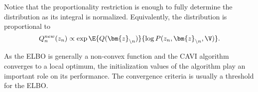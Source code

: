 Notice that the proportionality restriction is enough to fully determine the distribution as its integral is normalized. Equivalently, the distribution is proportional to
\[
    Q_{n}^{new}(z_{n}) \propto \exp{\E{Q(\bm{z}_{\backslash n})}{\log{P(z_{n}, \bm{z}_{\backslash n}, \V)}}}.
\]


As the ELBO is generally a non-convex function and the CAVI algorithm converges to a local optimum, the initialization values of the algorithm play an important role on its performance.
The convergence criteria is usually a threshold for the ELBO.
